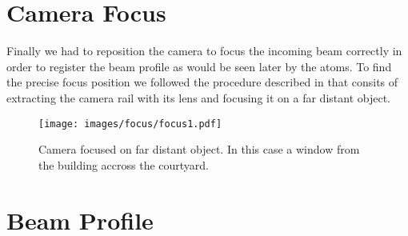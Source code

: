 \section{Camera Focus}

Finally we had to reposition the camera to focus the incoming beam correctly
in order to register the beam profile as would be seen later by the atoms.
To find the precise focus position we followed the procedure described in
\cite{Hertlein2017} that consits of extracting the camera rail with its lens
and focusing it on a far distant object.

\begin{figure}[ht]
  \centering
  \texttt{[image: images/focus/focus1.pdf]}
  \caption{Camera focused on far distant object. In this case a window from the
  building accross the courtyard.}
\end{figure}

\section{Beam Profile}

